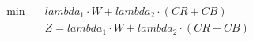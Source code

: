 \begin{align}
  \min\quad & \mathit{lambda}_{1} \cdot W + \mathit{lambda}_{2} \cdot \left(\mathit{CR} + \mathit{CB}\right) \tag{eq\_0040} \\
  & Z = \mathit{lambda}_{1} \cdot W + \mathit{lambda}_{2} \cdot \left(\mathit{CR} + \mathit{CB}\right) \tag{eq\_0039} \\
\end{align}

